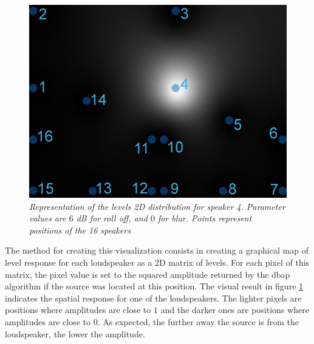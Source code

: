 \documentclass[twoside,10pt]{article}
\begin{document}
\begin{figure}[ht]
\centerline{\includegraphics[scale=0.5]{spk4_r_6_b_0+nbrs}}
\caption{{\it Representation of the levels 2D distribution for speaker 4. Parameter values are $6$ dB for roll off, and $0$ for blur. Points represent positions of the 16 speakers}}  
\label{fig:1spk}
\end{figure}


The method for creating this visualization consists in creating a graphical map of level response for each loudspeaker as a 2D matrix of levels. For each pixel of this matrix, the pixel value is set to the squared amplitude returned by the dbap algorithm if the source was located at this position. The visual result in figure \ref{fig:1spk} indicates the spatial response for one of the loudspeakers. The lighter pixels are positions where amplitudes are close to $1$ and the darker ones are positions where amplitudes are close to $0$. As expected, the further away the source is from the loudspeaker, the lower the amplitude. 

\end{document}
